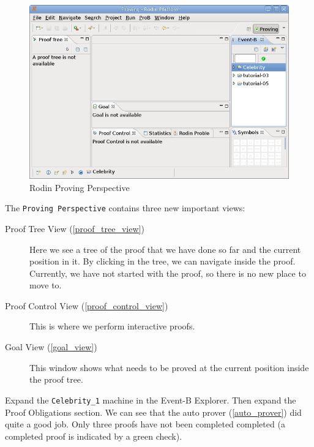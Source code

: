 \begin{figure}[!h]
\begin{center}
	\includegraphics{img/tutorial/tut_08_proving_perspective.png}
	\caption{Rodin Proving Perspective}
	\label{fig_tut_08_proving_perspective}
\end{center}
\end{figure}

The \texttt{Proving Perspective} contains three new important views:

\begin{description}
	\item[Proof Tree View (\ref{proof_tree_view})] Here we see a tree of the proof that we have done so far and the current position in it. By clicking in the tree, we can navigate inside the proof. Currently, we have not started with the proof, so there is no new place to move to. 
	\item[Proof Control View (\ref{proof_control_view})] This is where we perform interactive proofs.
	\item[Goal View (\ref{goal_view})] This window shows what needs to be proved at the current position inside the proof tree.
\end{description}

Expand the \texttt{Celebrity\_1} machine in the \textsf{Event-B Explorer}. Then expand the \textsf{Proof Obligations} section. We can see that the auto prover (\ref{auto_prover}) did quite a good job. Only three proofs have not been completed completed (a completed proof is indicated by a green check). 


